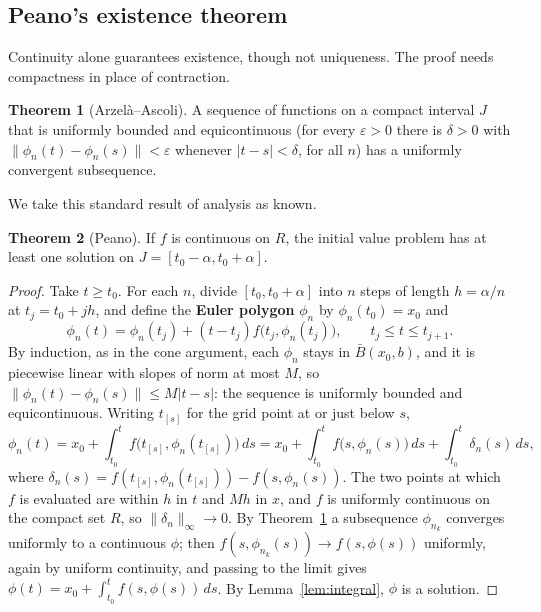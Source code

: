 \documentclass[11pt,a4paper]{article}
\numberwithin{equation}{section}
\theoremstyle{definition}
\newtheorem{thm}{Theorem}[subsection]
\begin{document}
\subsection{Peano's existence theorem}
\label{ssec:peano}

Continuity alone guarantees existence, though not uniqueness. The proof needs compactness in place of contraction.

\begin{thm}[Arzel\`a--Ascoli]
\label{thm:arzela}
A sequence of functions on a compact interval $J$ that is uniformly bounded and equicontinuous (for every $\varepsilon > 0$ there is $\delta > 0$ with $\|\phi_n(t) - \phi_n(s)\| < \varepsilon$ whenever
$|t - s| < \delta$, for all $n$) has a uniformly convergent subsequence.
\end{thm}

We take this standard result of analysis as known.

\begin{thm}[Peano]
\label{thm:peano}
If $f$ is continuous on $R$, the initial value problem has at least one solution on $J = [t_0 - \alpha, t_0 + \alpha]$.
\end{thm}

\begin{proof}
Take $t \geq t_0$. For each $n$, divide $[t_0, t_0 + \alpha]$ into $n$ steps of length $h = \alpha/n$ at $t_j = t_0 + jh$, and define the \textbf{Euler polygon} $\phi_n$ by $\phi_n(t_0) = x_0$ and
\[
\phi_n(t) = \phi_n(t_j) + (t - t_j)f\bigl(t_j, \phi_n(t_j)\bigr), \qquad t_j \leq t \leq t_{j+1} .
\]
By induction, as in the cone argument, each $\phi_n$ stays in $\bar B(x_0, b)$, and it is piecewise linear with slopes of norm at most $M$, so $\|\phi_n(t) - \phi_n(s)\| \leq M|t - s|$: the
sequence is uniformly bounded and equicontinuous. Writing $t_{[s]}$ for the grid point at or just below $s$,
\[
\phi_n(t) = x_0 + \int_{t_0}^tf\bigl(t_{[s]}, \phi_n(t_{[s]})\bigr)\,ds = x_0 + \int_{t_0}^tf\bigl(s, \phi_n(s)\bigr)\,ds + \int_{t_0}^t\delta_n(s)\,ds ,
\]
where $\delta_n(s) = f(t_{[s]}, \phi_n(t_{[s]})) - f(s, \phi_n(s))$. The two points at which $f$ is evaluated are within $h$ in $t$ and $Mh$ in $x$, and $f$ is uniformly continuous on the compact set $R$,
so $\|\delta_n\|_\infty \to 0$. By Theorem~\ref{thm:arzela} a subsequence $\phi_{n_k}$ converges uniformly to a continuous $\phi$; then $f(s, \phi_{n_k}(s)) \to f(s, \phi(s))$ uniformly, again by uniform
continuity, and passing to the limit gives $\phi(t) = x_0 + \int_{t_0}^tf(s, \phi(s))\,ds$. By Lemma~\ref{lem:integral}, $\phi$ is a solution.
\end{proof}
\end{document}

